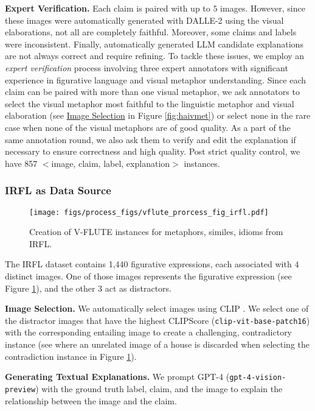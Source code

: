 {\bf Expert Verification.} Each claim is paired with up to $5$ images. However, since these images were automatically generated with DALLE-2 using the visual elaborations, not all are completely faithful. Moreover, some claims and labels were inconsistent. Finally, automatically generated LLM candidate explanations are not always correct and require refining. To tackle these issues, we employ an \textit{expert verification} process involving three expert annotators with significant experience in figurative language and visual metaphor understanding. Since each claim can be paired with more than one visual metaphor, we ask annotators to select the visual metaphor most faithful to the linguistic metaphor and visual elaboration (see \underline{Image Selection} in Figure \ref{fig:haivmet}) or select none in the rare case when none of the visual metaphors are of good quality. As a part of the same annotation round, we also ask them to verify and edit the explanation if necessary to ensure correctness and high quality. Post strict quality control, we have 857 $<$image, claim, label, explanation$>$ instances. 


\subsubsection{IRFL as Data Source} \label{sec:irfl}

\begin{figure}[!ht]
\centering
    \texttt{[image: figs/process\_figs/vflute\_prorcess\_fig\_irfl.pdf]}
    \caption{Creation of V-FLUTE instances for metaphors, similes, idioms from IRFL.}
    \label{fig:irfl}
\end{figure}

The IRFL dataset \cite{yosef-etal-2023-irfl} contains 1,440 figurative expressions, each associated with $4$ distinct images. One of those images represents the figurative expression (see Figure \ref{fig:irfl}), and the other 3 act as distractors. 

{\bf Image Selection.} We automatically select images using CLIP \cite{radford2021learning}. We select one of the distractor images that have the highest CLIPScore (\texttt{clip-vit-base-patch16}) with the corresponding entailing image to create a challenging, contradictory instance (see where an unrelated image of a house is discarded when selecting the contradiction instance in Figure \ref{fig:irfl}). 

{\bf Generating Textual Explanations.} We prompt GPT-4 (\texttt{gpt-4-vision-preview}) with the ground truth label, claim, and the image to explain the relationship between the image and the claim.

